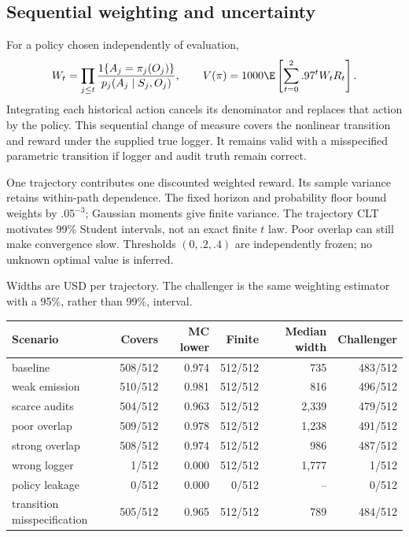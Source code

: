 \subsection{Sequential weighting and uncertainty}
For a policy chosen independently of evaluation,
\[
 W_t=\prod_{j\le t}\frac{1\{A_j=\pi_j(O_j)\}}{p_j(A_j\mid S_j,O_j)},\qquad
 V(\pi)=1000\E\left[\sum_{t=0}^2.97^t W_tR_t\right].
\]
Integrating each historical action cancels its denominator and replaces that action by the policy. This sequential change of measure covers the nonlinear transition and reward under the supplied true logger. It remains valid with a misspecified parametric transition if logger and audit truth remain correct.

One trajectory contributes one discounted weighted reward. Its sample variance retains within-path dependence. The fixed horizon and probability floor bound weights by $.05^{-3}$; Gaussian moments give finite variance. The trajectory CLT motivates 99\% Student intervals, not an exact finite $t$ law. Poor overlap can still make convergence slow. Thresholds $(0,.2,.4)$ are independently frozen; no unknown optimal value is inferred.

Widths are USD per trajectory. The challenger is the same weighting estimator with a 95\%, rather than 99\%, interval.

\begin{center}\footnotesize\begin{tabular}{lrrrrr}\toprule
Scenario & Covers & MC lower & Finite & Median width & Challenger\\
\midrule
baseline & 508/512 & 0.974 & 512/512 & 735 & 483/512 \\
weak emission & 510/512 & 0.981 & 512/512 & 816 & 496/512 \\
scarce audits & 504/512 & 0.963 & 512/512 & 2,339 & 479/512 \\
poor overlap & 509/512 & 0.978 & 512/512 & 1,238 & 491/512 \\
strong overlap & 508/512 & 0.974 & 512/512 & 986 & 487/512 \\
wrong logger & 1/512 & 0.000 & 512/512 & 1,777 & 1/512 \\
policy leakage & 0/512 & 0.000 & 0/512 & -- & 0/512 \\
transition misspecification & 505/512 & 0.965 & 512/512 & 789 & 484/512 \\
\bottomrule\end{tabular}\end{center}


